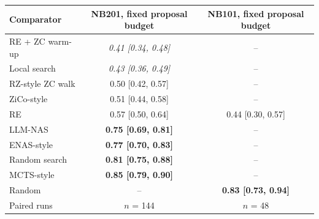 \begin{tabular}{@{}lcc@{}}
\toprule
Comparator & NB201, fixed proposal budget & NB101, fixed proposal budget\\
\midrule
RE + ZC warm-up & \textit{0.41 [0.34, 0.48]} & --\\
Local search & \textit{0.43 [0.36, 0.49]} & --\\
RZ-style ZC walk & 0.50 [0.42, 0.57] & --\\
ZiCo-style & 0.51 [0.44, 0.58] & --\\
RE & 0.57 [0.50, 0.64] & 0.44 [0.30, 0.57]\\
LLM-NAS & \textbf{0.75 [0.69, 0.81]} & --\\
ENAS-style & \textbf{0.77 [0.70, 0.83]} & --\\
Random search & \textbf{0.81 [0.75, 0.88]} & --\\
MCTS-style & \textbf{0.85 [0.79, 0.90]} & --\\
Random & -- & \textbf{0.83 [0.73, 0.94]}\\
\midrule
Paired runs & $n$ = 144 & $n$ = 48\\
\bottomrule
\end{tabular}
